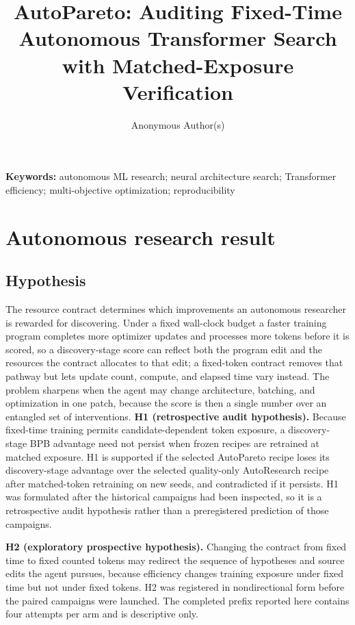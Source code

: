 \documentclass{article}
\title{AutoPareto: Auditing Fixed-Time Autonomous Transformer Search\\with Matched-Exposure Verification}
\author{Anonymous Author(s)}
\begin{document}
\maketitle
\begin{abstract}

\end{abstract}

\noindent\textbf{Keywords:} autonomous ML research; neural architecture search; Transformer efficiency; multi-objective optimization; reproducibility

\section{Autonomous research result}\label{partone}

\subsection{Hypothesis}
The resource contract determines which improvements an autonomous researcher is rewarded for discovering. Under a fixed wall-clock budget a faster training program completes more optimizer updates and processes more tokens before it is scored, so a discovery-stage score can reflect both the program edit and the resources the contract allocates to that edit; a fixed-token contract removes that pathway but lets update count, compute, and elapsed time vary instead. The problem sharpens when the agent may change architecture, batching, and optimization in one patch, because the score is then a single number over an entangled set of interventions.
\textbf{H1 (retrospective audit hypothesis).} Because fixed-time training permits candidate-dependent token exposure, a discovery-stage BPB advantage need not persist when frozen recipes are retrained at matched exposure. H1 is supported if the selected AutoPareto recipe loses its discovery-stage advantage over the selected quality-only AutoResearch recipe after matched-token retraining on new seeds, and contradicted if it persists. H1 was formulated after the historical campaigns had been inspected, so it is a retrospective audit hypothesis rather than a preregistered prediction of those campaigns.

\textbf{H2 (exploratory prospective hypothesis).} Changing the contract from fixed time to fixed counted tokens may redirect the sequence of hypotheses and source edits the agent pursues, because efficiency changes training exposure under fixed time but not under fixed tokens. H2 was registered in nondirectional form before the paired campaigns were launched. The completed prefix reported here contains four attempts per arm and is descriptive only.
\end{document}
